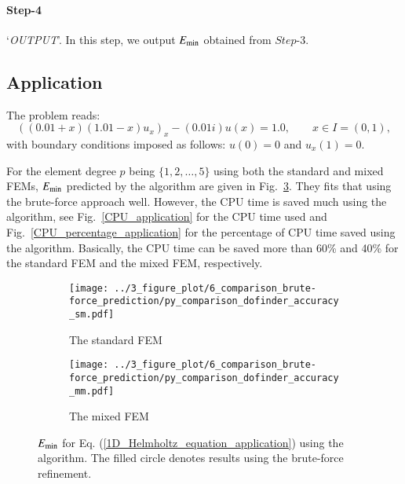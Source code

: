 \documentclass[review,3p]{elsarticle}
\begin{document}
\paragraph{Step-4} `\textit{OUTPUT}'. In this step, we output $E_{\rm min}$ obtained from $Step$-3.

\subsection{Application}		\label{section_validation}

The problem reads\citep{chernetsky2010effect}:
\begin{equation}
  \left((0.01+x)(1.01-x) u_x \right)_x -(0.01i) u(x) = 1.0,\qquad x \in I = (0,1),	\label{1D_Helmholtz_equation_application}
\end{equation}
with boundary conditions imposed as follows: $u(0)=0$ and $u_x(1)=0$.

For the element degree $p$ being $\{1, 2, \ldots, 5\}$ using both the standard and mixed FEMs, $E_{\rm min}$ predicted by the algorithm are given in Fig.~\ref{E_min_application}. They fits that using the brute-force approach well.
However, the CPU time is saved much using the algorithm, see Fig.~\ref{CPU_application} for the CPU time used and Fig.~\ref{CPU_percentage_application} for the percentage of CPU time saved using the algorithm. Basically, the CPU time can be saved more than 60\% and 40\% for the standard FEM and the mixed FEM, respectively.

\begin{figure}[!ht]
	\centering
    \begin{subfigure}{6.0cm}
        \texttt{[image: ../3\_figure\_plot/6\_comparison\_brute-force\_prediction/py\_comparison\_dofinder\_accuracy\_sm.pdf]}
        \caption{The standard FEM}
        \label{E_min_application_sm}
    \end{subfigure}
    \hspace{0.0cm}
    \begin{subfigure}{6.0cm}	                		 	
        \texttt{[image: ../3\_figure\_plot/6\_comparison\_brute-force\_prediction/py\_comparison\_dofinder\_accuracy\_mm.pdf]}
        \caption{The mixed FEM}
        \label{E_min_application_mm}
    \end{subfigure}
\caption{$E_{\rm min}$ for Eq. (\ref{1D_Helmholtz_equation_application}) using the algorithm. The filled circle denotes results using the brute-force refinement.}
\label{E_min_application}
\end{figure}
\end{document}

